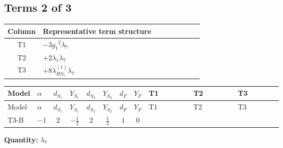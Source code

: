 \documentclass[8pt]{article}
\begin{document}
\begin{landscape}
\subsection*{Terms 2 of 3}
\begin{center}
\begin{tabular}{@{}c >{\raggedright\arraybackslash}p{0.82\linewidth}@{}}
\toprule
Column & Representative term structure \\
\midrule
T1 & \(\displaystyle -3 {g_1}^2 {\lambda_{7}}\) \\
\midrule
T2 & \(\displaystyle +2 {\lambda_1} {\lambda_{7}}\) \\
\midrule
T3 & \(\displaystyle +8 {\lambda_{HS_1}^{(1)}} {\lambda_{7}}\) \\
\midrule
\bottomrule
\end{tabular}
\end{center}
\smallskip
\tiny
\begin{longtable}{@{}llcccccc >{\raggedright\arraybackslash}p{0.21\linewidth} >{\raggedright\arraybackslash}p{0.21\linewidth} >{\raggedright\arraybackslash}p{0.21\linewidth}@{}}
\toprule
Model & $\alpha$ & $d_{S_1}$ & $Y_{S_1}$ & $d_{S_2}$ & $Y_{S_2}$ & $d_F$ & $Y_F$ & T1 & T2 & T3 \\
\midrule
\endfirsthead
\toprule
Model & $\alpha$ & $d_{S_1}$ & $Y_{S_1}$ & $d_{S_2}$ & $Y_{S_2}$ & $d_F$ & $Y_F$ & T1 & T2 & T3 \\
\midrule
\endhead
T3-B & $-1$ & $2$ & $-\frac{1}{2}$ & $2$ & $\frac{1}{2}$ & $1$ & $0$ & \scriptsize\adjustbox{max width=\linewidth}{$\begin{gathered} -3 {g_1}^2 {\lambda_{7}}\end{gathered}$} & \scriptsize\adjustbox{max width=\linewidth}{$\begin{gathered} +2 {\lambda_1} {\lambda_{7}}\end{gathered}$} & \scriptsize\adjustbox{max width=\linewidth}{$\begin{gathered} +8 {\lambda_{HS_1}^{(1)}} {\lambda_{7}}\end{gathered}$} \\
\midrule
\bottomrule
\end{longtable}
\clearpage
\noindent\textbf{Quantity: }$\lambda_{7}$\par\smallskip

\end{landscape}
\end{document}
